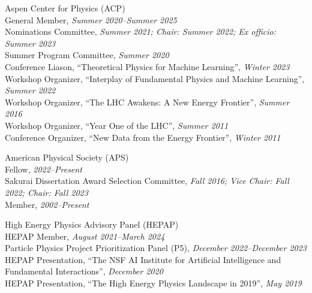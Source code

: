 \item Aspen Center for Physics (ACP)
\\ General Member, \emph{Summer 2020--Summer 2025}
\\ Nominations Committee, \emph{Summer 2021; Chair: Summer 2022; Ex officio: Summer 2023}
\\ Summer Program Committee, \emph{Summer 2020}
\\ Conference Liason, ``Theoretical Physics for Machine Learning'', \emph{Winter 2023}
\\ Workshop Organizer, ``Interplay of Fundamental Physics and Machine Learning'', \emph{Summer 2022}
\\ Workshop Organizer, ``The LHC Awakens: A New Energy Frontier'', \emph{Summer 2016}
\\ Workshop Organizer, ``Year One of the LHC'', \emph{Summer 2011}
\\ Conference Organizer, ``New Data from the Energy Frontier'', \emph{Winter 2011}
\item American Physical Society (APS)
\\ Fellow, \emph{2022--Present}
\\ Sakurai Dissertation Award Selection Committee, \emph{Fall 2016; Vice Chair: Fall 2022; Chair: Fall 2023}
\\ Member, \emph{2002--Present}
\item High Energy Physics Advisory Panel (HEPAP)
\\ HEPAP Member, \emph{August 2021--March 2024}
\\ Particle Physics Project Prioritization Panel (P5), \emph{December 2022--December 2023}
\\ HEPAP Presentation, ``The NSF AI Institute for Artificial Intelligence and Fundamental Interactions'', \emph{December 2020}
\\ HEPAP Presentation, ``The High Energy Physics Landscape in 2019'', \emph{May 2019}
